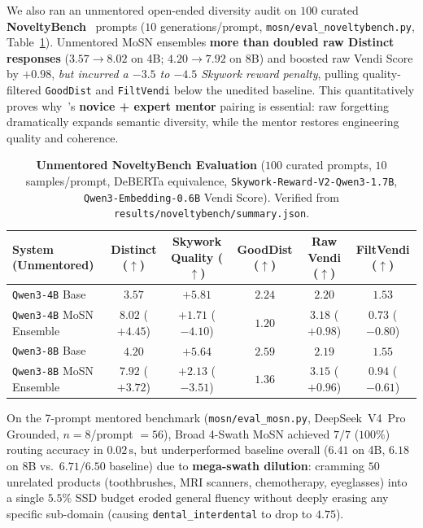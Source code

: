 \documentclass[10.5pt,letterpaper]{article}
\begin{document}
We also ran an unmentored open-ended diversity audit on $100$ curated \textbf{NoveltyBench}~\cite{zhang2025noveltybench} prompts ($10$ generations/prompt, \texttt{mosn/eval\_noveltybench.py}, Table~\ref{tab:noveltybench}). Unmentored MoSN ensembles \textbf{more than doubled raw Distinct responses} ($3.57 \to 8.02$ on 4B; $4.20 \to 7.92$ on 8B) and boosted raw Vendi Score by $+0.98$, \emph{but incurred a $-3.5$ to $-4.5$ Skywork reward penalty}, pulling quality-filtered \texttt{GoodDist} and \texttt{FiltVendi} below the unedited baseline. This quantitatively proves why~\cite{dambrosio2026value}'s \textbf{novice + expert mentor} pairing is essential: raw forgetting dramatically expands semantic diversity, while the mentor restores engineering quality and coherence.

\begin{table}[t]
\centering
\caption{\textbf{Unmentored NoveltyBench Evaluation} ($100$ curated prompts, $10$ samples/prompt, DeBERTa equivalence, \texttt{Skywork-Reward-V2-Qwen3-1.7B}, \texttt{Qwen3-Embedding-0.6B} Vendi Score). Verified from \texttt{results/noveltybench/summary.json}.}
\label{tab:noveltybench}
\footnotesize
\begin{tabular}{@{}l c c c c c@{}}
\toprule
\textbf{System (Unmentored)} & \textbf{Distinct ($\uparrow$)} & \textbf{Skywork Quality ($\uparrow$)} & \textbf{GoodDist ($\uparrow$)} & \textbf{Raw Vendi ($\uparrow$)} & \textbf{FiltVendi ($\uparrow$)} \\
\midrule
\texttt{Qwen3-4B} Base & $3.57$ & $+5.81$ & $2.24$ & $2.20$ & $1.53$ \\
\texttt{Qwen3-4B} MoSN Ensemble & $\mathbf{8.02}$ ($+4.45$) & $+1.71$ ($-4.10$) & $1.20$ & $\mathbf{3.18}$ ($+0.98$) & $0.73$ ($-0.80$) \\
\midrule
\texttt{Qwen3-8B} Base & $4.20$ & $+5.64$ & $2.59$ & $2.19$ & $1.55$ \\
\texttt{Qwen3-8B} MoSN Ensemble & $\mathbf{7.92}$ ($+3.72$) & $+2.13$ ($-3.51$) & $1.36$ & $\mathbf{3.15}$ ($+0.96$) & $0.94$ ($-0.61$) \\
\bottomrule
\end{tabular}
\end{table}

On the 7-prompt mentored benchmark (\texttt{mosn/eval\_mosn.py}, DeepSeek~V4~Pro Grounded, $n\!=\!8$/prompt $=56$), Broad 4-Swath MoSN achieved $7/7$ ($100\%$) routing accuracy in $0.02\,\text{s}$, but underperformed baseline overall ($6.41$ on 4B, $6.18$ on 8B vs.\ $6.71/6.50$ baseline) due to \textbf{mega-swath dilution}: cramming $50$ unrelated products (toothbrushes, MRI scanners, chemotherapy, eyeglasses) into a single $5.5\%$ SSD budget eroded general fluency without deeply erasing any specific sub-domain (causing \texttt{dental\_interdental} to drop to $4.75$).
\end{document}

